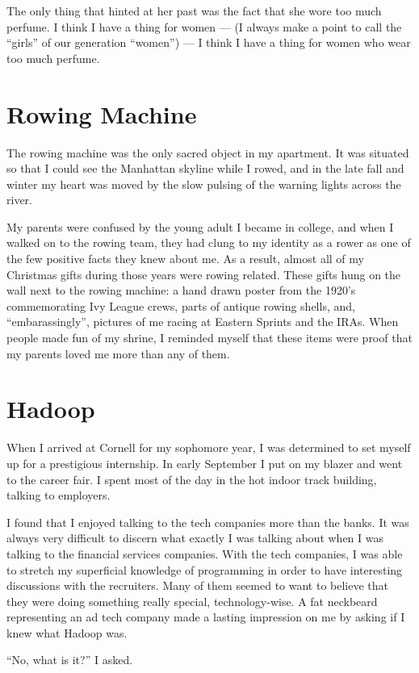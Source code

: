 \documentclass[12pt]{article}
\begin{document}
The only thing that hinted at her past was the fact that she wore too
much perfume.  I think I have a thing for women --- (I always make a point
to call the ``girls'' of our generation ``women'') --- I think I have a thing
for women who wear too much perfume.

\section{Rowing Machine}
The rowing machine was the only sacred object in my apartment.  It
was situated so that I could see the Manhattan skyline while I
rowed, and in the late fall and winter my heart was moved by the slow
pulsing of the warning lights across the river.

My parents were confused by the young adult I became in college, and
when I walked on to the rowing team, they had clung to my identity
as a rower as one of the few positive facts they knew about me.  As
a result, almost all of my Christmas gifts during those years were
rowing related.  These gifts hung on the wall next to the rowing
machine: a hand drawn poster from the 1920's commemorating Ivy
League crews, parts of antique rowing shells, and, ``embarassingly'',
pictures of me racing at Eastern Sprints and the IRAs.  When people
made fun of my shrine, I reminded myself that these items were proof
that my parents loved me more than any of them.

\section{Hadoop}
When I arrived at Cornell for my sophomore year, I was determined to set
myself up for a prestigious internship.  In early September I put on my
blazer and went to the career fair.  I spent most of the day in the
hot indoor track building, talking to employers. 

I found that I enjoyed talking to the tech companies more than the
banks.  It was always very difficult to discern what exactly I was
talking about when I was talking to the financial services companies.
With the tech companies, I was able to stretch my superficial knowledge
of programming in order to have interesting discussions with the
recruiters.  Many of them seemed to want to believe that they were doing
something really special, technology-wise.  A fat neckbeard representing
an ad tech company made a lasting impression on me by asking if I knew
what Hadoop was.  

``No, what is it?'' I asked.
\end{document}
